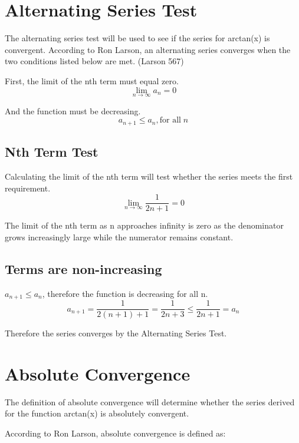 \documentclass[12pt, titlepage]{article}
\begin{document}
\section{Alternating Series Test}
The alternating series test will be used to see if the series for arctan(x) is convergent. According to Ron Larson, an alternating series converges when the two conditions listed below are met. (Larson 567)

First, the limit of the nth term must equal zero.
\begin{equation}
    \lim_{n \to \infty} a_{n} = 0
\end{equation}

And the function must be decreasing.
\begin{equation}
    a_{n+1} \leq a_{n}, \textrm{for all} \; n
\end{equation}

\subsection{Nth Term Test}
Calculating the limit of the nth term will test whether the series meets the first requirement.
\begin{equation}
    \lim_{n \to \infty} \frac{1}{2n+1} = 0     
\end{equation}

The limit of the nth term as n approaches infinity is zero as the denominator grows increasingly large while the numerator remains constant.

\subsection{Terms are non-increasing}
\(a_{n+1} \leq a_{n}\), therefore the function is decreasing for all n. 
\begin{equation}
    a_{n+1} = \frac{1}{2(n+1) + 1} = \frac{1}{2n+3} \leq \frac{1}{2n+1} = a_{n}
\end{equation}

Therefore the series converges by the Alternating Series Test.

\section{Absolute Convergence}
The definition of absolute convergence will determine whether the series derived for the function arctan(x) is absolutely convergent.

According to Ron Larson, absolute convergence is defined as: 
\end{document}
